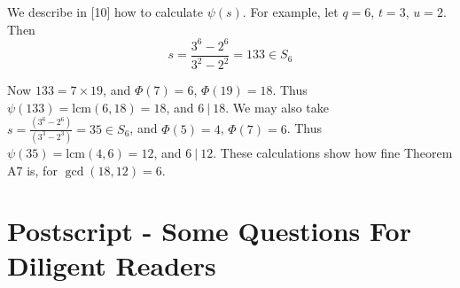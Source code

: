 We describe in [10] how to calculate $\psi(s)$. For example, let $q=6$, $t=3$, $u=2$. Then
\begin{equation*}
s = \frac{3^{6}-2^{6}}{3^{2}-2^{2}} = 133 \in S_{6}
\end{equation*}

Now $133 = 7 \times 19$, and $\Phi(7) = 6$, $\Phi(19) = 18$. Thus $\psi(133) = \text{lcm}(6,18) = 18$, and $6\ |\ 18$. We may also take $s = \frac{(3^{6}-2^{6})}{(3^{3}-2^{3})} = 35 \in S_{6}$, and $\Phi(5) = 4$, $\Phi(7) = 6$. Thus $\psi(35) = \text{lcm}(4,6) = 12$, and $6\ |\ 12$. These calculations show how fine Theorem A7 is, for $\gcd(18,12) = 6$.




\newpage

\section*{Postscript - Some Questions For Diligent Readers}


